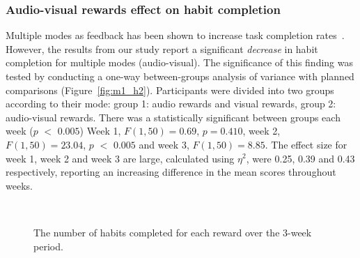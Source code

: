 \documentclass{scaffold/sigchi}
\begin{document}
\subsubsection{Audio-visual rewards effect on habit completion}
Multiple modes as feedback has been shown to increase task completion rates~\cite{comparing_modalities_effects_of_visual_auditory, benefits_of_audio_visual_1, benefits_of_audio_visual_2}. However, the results from our study report a significant \textit{decrease} in habit completion for multiple modes (audio-visual). The significance of this finding was tested by conducting a one-way between-groups analysis of variance with planned comparisons (Figure~\ref{fig:m1_h2}). Participants were divided into two groups according to their mode: group 1: audio rewards and visual rewards, group 2: audio-visual rewards. There was a statistically significant  between groups each week ($p$ $<$ $0.005$) Week 1, $F(1,50) = 0.69$, $p = 0.410$, week 2, $F(1,50) = 23.04$, $p$ $<$ $0.005$ and week 3, $F(1,50) = 8.85$. The effect size for week 1, week 2 and week 3 are large, calculated using $\eta^{2}$, were 0.25, 0.39 and 0.43 respectively, reporting an increasing difference in the mean scores throughout weeks.



\begin{figure}
\centering
  \caption{The number of habits completed for each reward over the 3-week period.}~\label{fig:m1_h1_a}
\end{figure}
\end{document}
